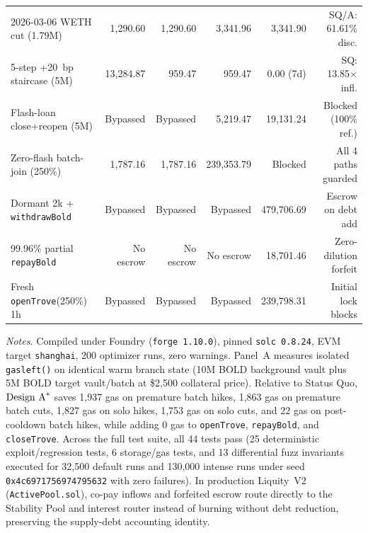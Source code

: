 \begin{table}[t]
\begin{threeparttable}
\begin{tabular}{@{}l r r r r r@{}}
2026-03-06 WETH cut (1.79M) & 1,290.60 & 1,290.60 & 3,341.96 & 3,341.90 & SQ/A: 61.61\% disc. \\
5-step +20~bp staircase (5M) & 13,284.87 & 959.47 & 959.47 & 0.00 (7d) & SQ: 13.85$\times$ infl. \\
Flash-loan close+reopen (5M) & Bypassed & Bypassed & 5,219.47 & 19,131.24 & Blocked (100\% ref.) \\
Zero-flash batch-join (250\%) & 1,787.16 & 1,787.16 & 239,353.79 & Blocked & All 4 paths guarded \\
Dormant 2k + \texttt{withdrawBold} & Bypassed & Bypassed & Bypassed & 479,706.69 & Escrow on debt add \\
99.96\% partial \texttt{repayBold} & No escrow & No escrow & No escrow & 18,701.46 & Zero-dilution forfeit \\
Fresh \texttt{openTrove}(250\%) 1h & Bypassed & Bypassed & Bypassed & 239,798.31 & Initial lock blocks \\
\bottomrule
\end{tabular}
\begin{tablenotes}[flushleft]
\footnotesize
\item \textit{Notes.} Compiled under Foundry (\texttt{forge 1.10.0}), pinned \texttt{solc 0.8.24}, EVM target \texttt{shanghai}, 200 optimizer runs, zero warnings. Panel~A measures isolated \texttt{gasleft()} on identical warm branch state (10M BOLD background vault plus 5M BOLD target vault/batch at \$2,500 collateral price). Relative to Status Quo, $\textup{Design A}^*$ saves 1,937 gas on premature batch hikes, 1,863 gas on premature batch cuts, 1,827 gas on solo hikes, 1,753 gas on solo cuts, and 22 gas on post-cooldown batch hikes, while adding 0 gas to \texttt{openTrove}, \texttt{repayBold}, and \texttt{closeTrove}. Across the full test suite, all 44 tests pass (25 deterministic exploit/regression tests, 6 storage/gas tests, and 13 differential fuzz invariants executed for 32,500 default runs and 130,000 intense runs under seed \texttt{0x4c6971756974795632} with zero failures). In production Liquity~V2 (\texttt{ActivePool.sol}), co-pay inflows and forfeited escrow route directly to the Stability Pool and interest router instead of burning without debt reduction, preserving the supply-debt accounting identity.
\end{tablenotes}
\end{threeparttable}
\end{table}

